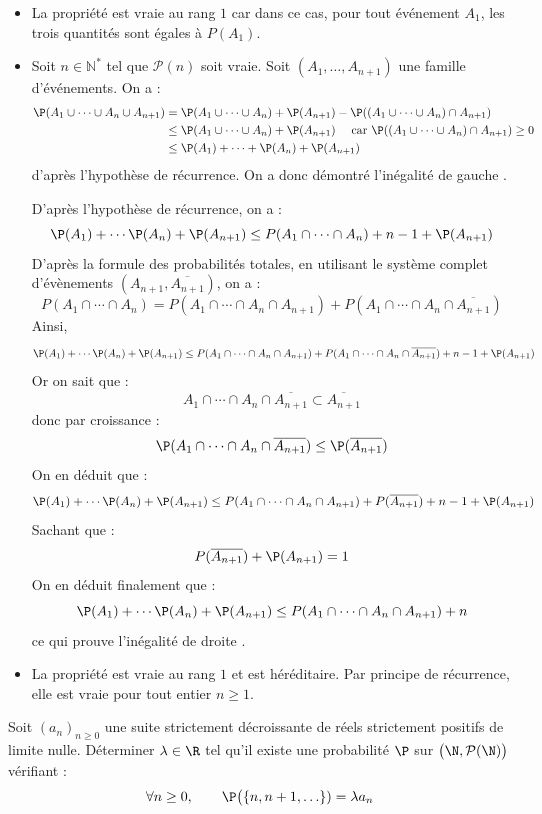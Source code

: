 \documentclass[a4paper,10pt]{report}
\begin{document}
\begin{itemize}
\item La propriété est vraie au rang $1$ car dans ce cas, pour tout événement $A_1$, les trois quantités sont égales à $P(A_1)$.
\item Soit $n \in \mathbb{N}^*$ tel que $\mathcal{P}(n)$ soit vraie. Soit $(A_1, \ldots, A_{n+1})$ une famille d'événements. On a :
\begin{align*}
\P(A_1 \cup \cdots \cup A_n \cup A_{n+1}) & = \P(A_1 \cup \cdots  \cup A_{n}) + \P(A_{n+1}) - \P((A_1 \cup \cdots \cup A_n) \cap A_{n+1}) \\
& \leq \P(A_1 \cup \cdots  \cup A_{n}) + \P(A_{n+1}) \quad \hbox{ car } \P((A_1 \cup \cdots \cup A_n) \cap A_{n+1}) \geq 0 \\
& \leq \P(A_1) + \cdots + \P(A_n) + \P(A_{n+1})
\end{align*}
d'après l'hypothèse de récurrence. On a donc démontré l'inégalité \og de gauche \fg.

\medskip

\noindent D'après l'hypothèse de récurrence, on a :
$$  \P(A_1) + \cdots \P(A_n) + \P(A_{n+1}) \leq P(A_1 \cap \cdots \cap A_n) + n-1  + \P(A_{n+1})$$
D'après la formule des probabilités totales, en utilisant le système complet d'évènements $(A_{n+1}, \overline{A_{n+1}})$, on a :
$$ P(A_1 \cap \cdots \cap A_n) = P(A_1 \cap \cdots \cap A_n \cap A_{n+1}) + P(A_1 \cap \cdots \cap A_n \cap \overline{A_{n+1}})$$
Ainsi,
$$ \P(A_1) + \cdots \P(A_n) + \P(A_{n+1}) \leq P(A_1 \cap \cdots \cap A_n \cap A_{n+1}) + P(A_1 \cap \cdots \cap A_n \cap \overline{A_{n+1}}) + n-1  + \P(A_{n+1})$$
Or on sait que :
$$ A_1 \cap \cdots \cap A_n \cap \overline{A_{n+1}} \subset \overline{A_{n+1}}$$
donc par croissance :
$$ \P(A_1 \cap \cdots \cap A_n \cap \overline{A_{n+1}}) \leq \P(\overline{A_{n+1}})$$
On en déduit que : 
$$ \P(A_1) + \cdots \P(A_n) + \P(A_{n+1}) \leq P(A_1 \cap \cdots \cap A_n \cap A_{n+1}) + P(\overline{A_{n+1}}) + n-1  + \P(A_{n+1})$$
Sachant que :
$$ P(\overline{A_{n+1}}) + \P(A_{n+1})=1$$
On en déduit finalement que :
$$  \P(A_1) + \cdots \P(A_n) + \P(A_{n+1}) \leq P(A_1 \cap \cdots \cap A_n \cap A_{n+1}) +n $$
ce qui prouve l'inégalité \og de droite \fg.
\item La propriété est vraie au rang $1$ et est héréditaire. Par principe de récurrence, elle est vraie pour tout entier $n \geq 1$.
\end{itemize}


\begin{Exercice}{} Soit $(a_n)_{n \geq 0}$ une suite strictement décroissante de réels strictement positifs de limite nulle.  Déterminer $\lambda \in \R$ tel qu'il existe une probabilité $\P$ sur $\bigl(\N,\mathcal{P}(\N)\bigr)$ vérifiant :
    \[
    \forall n \geq 0, \qquad \P\bigl( \lbrace n, n+1, \ldots \rbrace) = \lambda a_n
    \]
\end{Exercice} 
\end{document}
